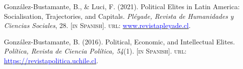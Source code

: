 





\begin{publications}

\begin{benumerate}{2}

\item{\small González-Bustamante, B., \& Luci, F. (2021). Political Elites in Latin America: Socialisation, Trajectories, and Capitals. {\itshape Pléyade, Revista de Humanidades y Ciencias Sociales}, 28. {\footnotesize \scshape [in Spanish]}. {\scshape url:} \href{http://www.revistapleyade.cl/index.php/OJS/issue/view/30}{\textcolor{blue}{www.revistapleyade.cl}}.}\vspace{1mm}

\item{\small González-Bustamante, B. (2016). Political, Economic, and Intellectual Elites. {\itshape Política, Revista de Ciencia Política, 54}(1). {\footnotesize \scshape [in Spanish]}. {\scshape url:} \href{https://revistapolitica.uchile.cl/index.php/RP/issue/view/4365}{\textcolor{blue}{https://revistapolitica.uchile.cl}}.}\vspace{1mm}

\end{benumerate}

\end{publications}
